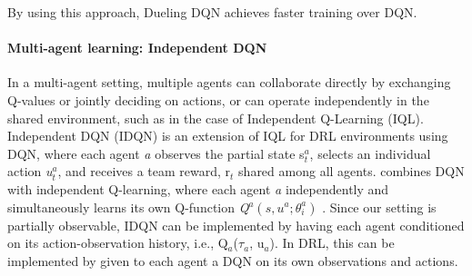 \documentclass{llncs}
\begin{document}
By using this approach, Dueling DQN achieves faster training over DQN. 
	





\paragraph{\textbf{Multi-agent learning: Independent DQN}}
In a multi-agent setting, multiple agents can collaborate directly by exchanging Q-values or jointly deciding on actions, or can operate independently in the shared environment, such as in the case of Independent Q-Learning (IQL)\cite{Tan1993}. Independent DQN (IDQN) is an extension of IQL for DRL environments using DQN, where each agent \textit{a} observes the partial state s$_{t}^{a}$, selects an individual action \textit{u$_{t}^{a}$}, and receives a team reward, r$_{t}$ shared among all agents. \cite{Tampuu2015} combines DQN with independent Q-learning, where each agent \textit{a} independently and simultaneously learns its own Q-function \textit{Q$^{a}(s, u^{a};\theta^{a}_{i})$} \cite{DBLP:journals/corr/FoersterAFW16a}. Since our setting is partially observable, IDQN can be implemented by having each agent conditioned on its action-observation history, i.e., Q$_{a}$($\tau_{a}$, u$_{a}$). In DRL, this can be implemented by given to each agent a DQN on its own observations and actions.
\end{document}
